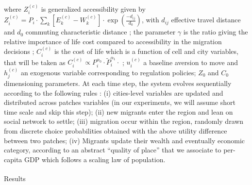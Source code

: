 where $Z_i^{(c)}$ is generalized accessibility given by $Z_i^{(c)} = P_i \cdot \sum_k \left[E_k^{(c)}-W_k^{(c)}\right]\cdot \exp{\left(\frac{-d_{ij}}{d_0}\right)}$, with $d_{ij}$ effective travel distance %
 and $d_0$ commuting characteristic distance ; the parameter $\gamma$ is the ratio giving the relative importance of life cost compared to accessibility in the migration decisions ; $C_i^{(c)}$ is the cost of life which is a function of cell and city variables, that will be taken as $C_i^{(c)} \propto P_i^{\alpha_0}\cdot  \tilde{P}_i^{\alpha_1}\cdot$ ; $u_i^{(c)}$ a baseline aversion to move and $h_j^{(c)}$ an exogenous variable corresponding to regulation policies; $Z_0$ and $C_0$ dimensioning parameters. At each time step, the system evolves sequentially according to the following rules : (i) cities-level variables are updated and distributed across patches variables (in our experiments, we will assume short time scale and skip this step); (ii) new migrants enter the region and lean on social network to settle; (iii) migration occur within the region, randomly drawn from discrete choice probabilities obtained with the above utility difference between two patches; (iv) Migrants update their wealth and eventually economic category, according to an abstract ``quality of place'' that we associate to per-capita GDP which follows a scaling law of population.



\paragraph{}{Results}

